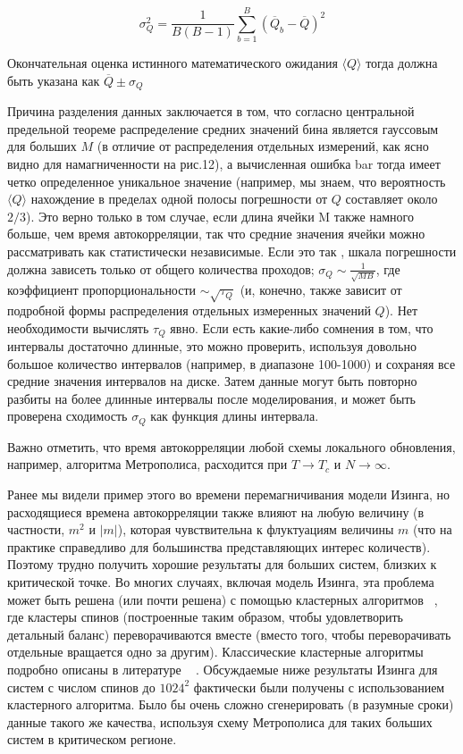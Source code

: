 \documentclass[11pt]{article}
\begin{document}
\begin{equation*}
{\sigma}_Q^2=\frac{1}{B(B-1)}\sum\limits_{b=1}^B (\overline{Q}_b - \overline{Q})^2
\end{equation*}

Окончательная оценка истинного математического ожидания $\langle Q \rangle$ тогда должна быть указана как $\overline{Q} \pm \sigma_Q$

Причина разделения данных заключается в том, что согласно центральной предельной теореме распределение средних значений бина является гауссовым для больших $M$ (в отличие от распределения отдельных измерений, как ясно видно для намагниченности на рис.12), а вычисленная ошибка bar тогда имеет четко определенное уникальное значение (например, мы знаем, что вероятность $\langle Q \rangle$ нахождение в пределах одной полосы погрешности от $Q$ составляет около $2/3$). Это верно только в том случае, если длина ячейки M также намного больше, чем время автокорреляции, так что средние значения ячейки можно рассматривать как статистически независимые. Если это так , шкала погрешности должна зависеть только от общего количества проходов; $\sigma_Q \sim \frac{1}{\sqrt{MB}}$, где коэффициент пропорциональности $\sim \sqrt{\tau_Q}$ (и, конечно, также зависит от подробной формы распределения отдельных измеренных значений $Q$). Нет необходимости вычислять $\tau_Q$ явно. Если есть какие-либо сомнения в том, что интервалы достаточно длинные, это можно проверить, используя довольно большое количество интервалов (например, в диапазоне 100-1000) и сохраняя все средние значения интервалов на диске. Затем данные могут быть повторно разбиты на более длинные интервалы после моделирования, и может быть проверена сходимость $\sigma_Q$ как функция длины интервала. 

Важно отметить, что время автокорреляции любой схемы локального обновления, например, алгоритма Метрополиса, расходится при $T → T_c$ и $​​N → ∞$.

Ранее мы видели пример этого во времени перемагничивания модели Изинга, но расходящиеся времена автокорреляции также влияют на любую величину (в частности, $m^2$ и $|m|$), которая чувствительна к флуктуациям величины $m$ (что на практике справедливо для большинства представляющих интерес количеств). Поэтому трудно получить хорошие результаты для больших систем, близких к критической точке. Во многих случаях, включая модель Изинга, эта проблема может быть решена (или почти решена) с помощью кластерных алгоритмов ~\cite{prl_58_86, prl_62_361}, где кластеры спинов (построенные таким образом, чтобы удовлетворить детальный баланс) переворачиваются вместе (вместо того, чтобы переворачивать отдельные вращается одно за другим). Классические кластерные алгоритмы подробно описаны в литературе ~\cite{Landau_Binder, Newman_Barkema} . Обсуждаемые ниже результаты Изинга для систем с числом спинов до $1024^2$ фактически были получены с использованием кластерного алгоритма. Было бы очень сложно сгенерировать (в разумные сроки) данные такого же качества, используя схему Метрополиса для таких больших систем в критическом регионе.
\end{document}
